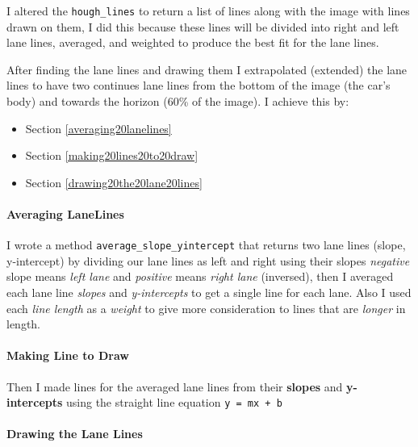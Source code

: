 \documentclass[11pt]{article}
\providecommand{\tightlist}{%
      \setlength{\itemsep}{0pt}\setlength{\parskip}{0pt}}
\begin{document}
I altered the \texttt{hough\_lines} to return a list of lines along with
the image with lines drawn on them, I did this because these lines will
be divided into right and left lane lines, averaged, and weighted to
produce the best fit for the lane lines.

After finding the lane lines and drawing them I extrapolated (extended)
the lane lines to have two continues lane lines from the bottom of the
image (the car's body) and towards the horizon (60\% of the image). I
achieve this by:

\begin{itemize}
\tightlist
\item
  Section \ref{averaging20lanelines}
\item
  Section \ref{making20lines20to20draw}
\item
  Section \ref{drawing20the20lane20lines}
\end{itemize}

\hypertarget{averaging-lanelines}{%
\paragraph{Averaging LaneLines}\label{averaging-lanelines}}

I wrote a method \texttt{average\_slope\_yintercept} that returns two
lane lines (slope, y-intercept) by dividing our lane lines as left and
right using their slopes \emph{negative} slope means \emph{left lane}
and \emph{positive} means \emph{right lane} (inversed), then I averaged
each lane line \emph{slopes} and \emph{y-intercepts} to get a single
line for each lane. Also I used each \emph{line length} as a
\emph{weight} to give more consideration to lines that are \emph{longer}
in length.

\hypertarget{making-line-to-draw}{%
\paragraph{Making Line to Draw}\label{making-line-to-draw}}

Then I made lines for the averaged lane lines from their \textbf{slopes}
and \textbf{y-intercepts} using the straight line equation
\texttt{y\ =\ mx\ +\ b}

\hypertarget{drawing-the-lane-lines}{%
\paragraph{Drawing the Lane Lines}\label{drawing-the-lane-lines}}
\end{document}
